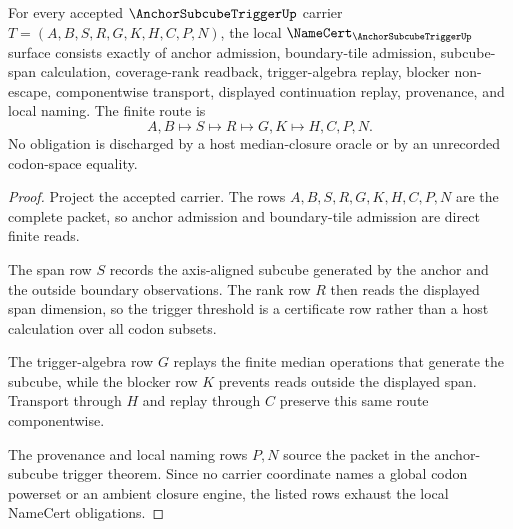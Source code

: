 \begin{theorem}
\label{thm:anchor-subcube-trigger-namecert-obligations}
For every accepted $\AnchorSubcubeTriggerUp$ carrier $T=(A,B,S,R,G,K,H,C,P,N)$, the local $\NameCert_{\AnchorSubcubeTriggerUp}$ surface consists exactly of anchor admission, boundary-tile admission, subcube-span calculation, coverage-rank readback, trigger-algebra replay, blocker non-escape, componentwise transport, displayed continuation replay, provenance, and local naming. The finite route is
$$
A,B \longmapsto S \longmapsto R \longmapsto G,K \longmapsto H,C,P,N .
$$
No obligation is discharged by a host median-closure oracle or by an unrecorded codon-space equality.
\end{theorem}
\begin{proof}
Project the accepted carrier. The rows $A,B,S,R,G,K,H,C,P,N$ are the complete packet, so anchor admission and boundary-tile admission are direct finite reads.

The span row $S$ records the axis-aligned subcube generated by the anchor and the outside boundary observations. The rank row $R$ then reads the displayed span dimension, so the trigger threshold is a certificate row rather than a host calculation over all codon subsets.

The trigger-algebra row $G$ replays the finite median operations that generate the subcube, while the blocker row $K$ prevents reads outside the displayed span. Transport through $H$ and replay through $C$ preserve this same route componentwise.

The provenance and local naming rows $P,N$ source the packet in the anchor-subcube trigger theorem. Since no carrier coordinate names a global codon powerset or an ambient closure engine, the listed rows exhaust the local NameCert obligations.
\end{proof}

